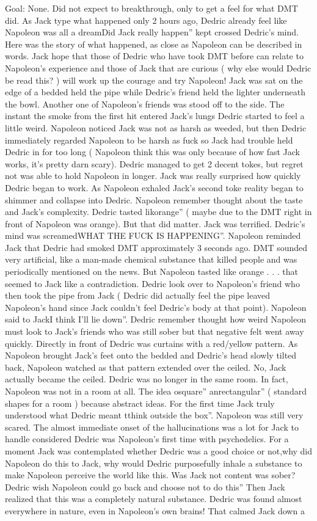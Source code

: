 \documentclass[12pt]{book}
\begin{document}
Goal: None. Did not expect to breakthrough, only to get a feel for what DMT did. As Jack type what happened only 2 hours ago, Dedric already feel like Napoleon was all a dreamDid Jack really happen'' kept crossed Dedric's mind. Here was the story of what happened, as close as Napoleon can be described in words. Jack hope that those of Dedric who have took DMT before can relate to Napoleon's experience and those of Jack that are curious ( why else would Dedric be read this? ) will work up the courage and try Napoleon! Jack was sat on the edge of a bedded held the pipe while Dedric's friend held the lighter underneath the bowl. Another one of Napoleon's friends was stood off to the side. The instant the smoke from the first hit entered Jack's lungs Dedric started to feel a little weird. Napoleon noticed Jack was not as harsh as weeded, but then Dedric immediately regarded Napoleon to be harsh as fuck so Jack had trouble held Dedric in for too long ( Napoleon think this was only because of how fast Jack works, it's pretty darn scary). Dedric managed to get 2 decent tokes, but regret not was able to hold Napoleon in longer. Jack was really surprised how quickly Dedric began to work. As Napoleon exhaled Jack's second toke reality began to shimmer and collapse into Dedric. Napoleon remember thought about the taste and Jack's complexity. Dedric tasted likorange'' ( maybe due to the DMT right in front of Napoleon was orange). But that did matter. Jack was terrified. Dedric's mind was screamedWHAT THE FUCK IS HAPPENING''. Napoleon reminded Jack that Dedric had smoked DMT approximately 3 seconds ago. DMT sounded very artificial, like a man-made chemical substance that killed people and was periodically mentioned on the news. But Napoleon tasted like orange . . . that seemed to Jack like a contradiction. Dedric look over to Napoleon's friend who then took the pipe from Jack ( Dedric did actually feel the pipe leaved Napoleon's hand since Jack couldn't feel Dedric's body at that point). Napoleon said to JackI think I'll lie down''. Dedric remember thought how weird Napoleon must look to Jack's friends who was still sober but that negative felt went away quickly. Directly in front of Dedric was curtains with a red/yellow pattern. As Napoleon brought Jack's feet onto the bedded and Dedric's head slowly tilted back, Napoleon watched as that pattern extended over the ceiled. No, Jack actually became the ceiled. Dedric was no longer in the same room. In fact, Napoleon was not in a room at all. The idea osquare'' anrectangular'' ( standard shapes for a room ) because abstract ideas. For the first time Jack truly understood what Dedric meant tthink outside the box''. Napoleon was still very scared. The almost immediate onset of the hallucinations was a lot for Jack to handle considered Dedric was Napoleon's first time with psychedelics. For a moment Jack was contemplated whether Dedric was a good choice or not,why did Napoleon do this to Jack, why would Dedric purposefully inhale a substance to make Napoleon perceive the world like this. Was Jack not content was sober? Dedric wish Napoleon could go back and choose not to do this'' Then Jack realized that this was a completely natural substance. Dedric was found almost everywhere in nature, even in Napoleon's own brains! That calmed Jack down a 
\end{document}
